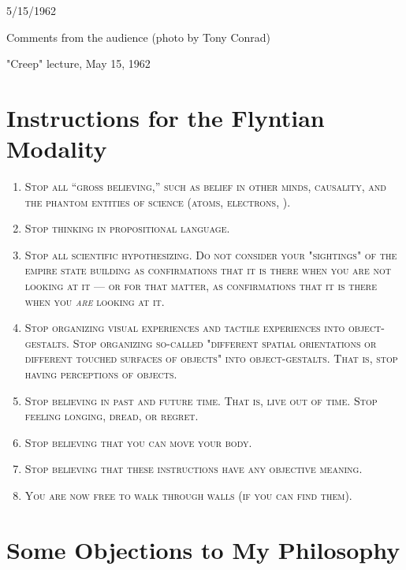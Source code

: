\documentclass[10pt,twoside,draft]{memoir}
\begin{document}
\clearpage

{
5/15/1962 


Comments from the audience 
(photo by Tony Conrad) 


"Creep" lecture, May 15, 1962 
}

\clearpage


\chapter{Instructions for the Flyntian Modality}

\begin{enumerate}

\item \textsc{ Stop all \enquote{gross believing,} such as belief in other minds, causality, and the phantom entities of science (atoms, electrons, \etc).}

\item \textsc{Stop thinking in propositional language.}

\item \textsc{Stop all scientific hypothesizing. Do not consider your "sightings" of the empire state building as confirmations that it is there when you are not looking at it --- or for that matter, as confirmations that it is there when you \emph{are} looking at it.}

\item \textsc{Stop organizing visual experiences and tactile experiences into object-gestalts. Stop organizing so-called "different spatial orientations or different touched surfaces of objects" into object-gestalts. That is, stop having perceptions of objects.}

\item \textsc{Stop believing in past and future time. That is, live out of time. Stop feeling longing, dread, or regret.}

\item \textsc{Stop believing that you can move your body.}

\item \textsc{Stop believing that these instructions have any objective meaning.}

\item \textsc{You are now free to walk through walls (if you can find them).}
\end{enumerate}

\chapter{Some Objections to My Philosophy}
\end{document}
